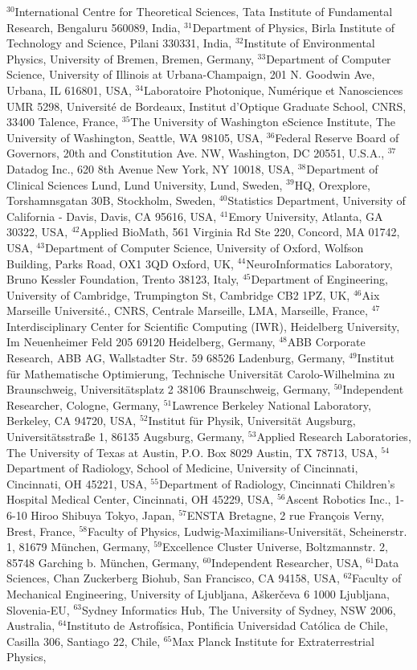 $^{30}$International Centre for Theoretical Sciences, Tata Institute of Fundamental Research, Bengaluru 560089, India, $^{31}$Department of Physics, Birla Institute of Technology and Science, Pilani 330331, India, $^{32}$Institute of Environmental Physics, University of Bremen, Bremen, Germany, $^{33}$Department of Computer Science, University of Illinois at Urbana-Champaign, 201 N. Goodwin Ave, Urbana, IL 616801, USA, $^{34}$Laboratoire Photonique, Num\'erique et Nanosciences UMR 5298, Universit\'e de Bordeaux, Institut d'Optique Graduate School, CNRS, 33400 Talence, France, $^{35}$The University of Washington eScience Institute, The University of Washington, Seattle, WA 98105, USA, $^{36}$Federal Reserve Board of Governors,  20th and Constitution Ave. NW, Washington, DC 20551, U.S.A., $^{37}$Datadog Inc., 620 8th Avenue New York, NY 10018, USA, $^{38}$Department of Clinical Sciences Lund, Lund University, Lund, Sweden, $^{39}$HQ, Orexplore, Torshamnsgatan 30B, Stockholm, Sweden, $^{40}$Statistics Department, University of California - Davis, Davis, CA 95616, USA, $^{41}$Emory University, Atlanta, GA 30322, USA, $^{42}$Applied BioMath, 561 Virginia Rd Ste 220, Concord, MA 01742, USA, $^{43}$Department of Computer Science, University of Oxford, Wolfson Building, Parks Road, OX1 3QD Oxford, UK, $^{44}$NeuroInformatics Laboratory, Bruno Kessler Foundation, Trento 38123, Italy, $^{45}$Department of Engineering, University of Cambridge, Trumpington St, Cambridge CB2 1PZ, UK, $^{46}$Aix Marseille Universit\'e., CNRS, Centrale Marseille, LMA, Marseille, France, $^{47}$Interdisciplinary Center for Scientific Computing (IWR), Heidelberg University, Im Neuenheimer Feld 205 69120 Heidelberg, Germany, $^{48}$ABB Corporate Research, ABB AG, Wallstadter Str. 59 68526 Ladenburg, Germany, $^{49}$Institut f\"ur Mathematische Optimierung, Technische Universit\"at Carolo-Wilhelmina zu Braunschweig, Universit\"atsplatz 2 38106 Braunschweig, Germany, $^{50}$Independent Researcher, Cologne, Germany, $^{51}$Lawrence Berkeley National Laboratory, Berkeley, CA 94720, USA, $^{52}$Institut f{\"u}r Physik, Universit{\"a}t Augsburg, Universit{\"a}tsstra{\ss}e 1, 86135 Augsburg, Germany, $^{53}$Applied Research Laboratories, The University of Texas at Austin, P.O. Box 8029 Austin, TX 78713, USA, $^{54}$Department of Radiology, School of Medicine, University of Cincinnati, Cincinnati, OH 45221, USA, $^{55}$Department of Radiology, Cincinnati Children's Hospital Medical Center, Cincinnati, OH 45229, USA, $^{56}$Ascent Robotics Inc., 1-6-10 Hiroo Shibuya Tokyo, Japan, $^{57}$ENSTA Bretagne, 2 rue François Verny, Brest, France, $^{58}$Faculty of Physics, Ludwig-Maximilians-Universit\"at, Scheinerstr. 1, 81679 M\"unchen, Germany, $^{59}$Excellence Cluster Universe, Boltzmannstr. 2, 85748 Garching b. M\"unchen, Germany, $^{60}$Independent Researcher, USA, $^{61}$Data Sciences, Chan Zuckerberg Biohub, San Francisco, CA 94158, USA, $^{62}$Faculty of Mechanical Engineering, University of Ljubljana, A\v{s}ker\v{c}eva 6 1000 Ljubljana, Slovenia-EU, $^{63}$Sydney Informatics Hub, The University of Sydney, NSW 2006, Australia, $^{64}$Instituto de Astrof\'{i}sica, Pontificia Universidad Cat\'{o}lica de Chile, Casilla 306, Santiago 22, Chile, $^{65}$Max Planck Institute for Extraterrestrial Physics, 